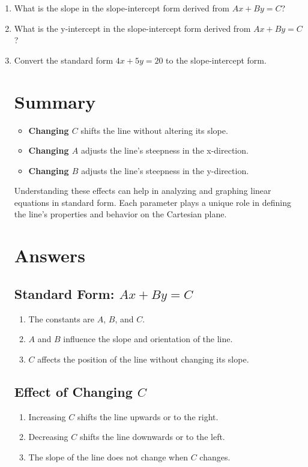 \documentclass[12pt]{article}
\begin{document}
\begin{enumerate}
    \item What is the slope in the slope-intercept form derived from \(Ax + By = C\)?
    \item What is the y-intercept in the slope-intercept form derived from \(Ax + By = C\)?
    \item Convert the standard form \(4x + 5y = 20\) to the slope-intercept form.

\section*{Summary}

\begin{itemize}
    \item \textbf{Changing \(C\)} shifts the line without altering its slope.
    \item \textbf{Changing \(A\)} adjusts the line's steepness in the x-direction.
    \item \textbf{Changing \(B\)} adjusts the line's steepness in the y-direction.
\end{itemize}

Understanding these effects can help in analyzing and graphing linear equations in standard form. Each parameter plays a unique role in defining the line's properties and behavior on the Cartesian plane.

\newpage

\section*{Answers}

\subsection*{Standard Form: \(Ax + By = C\)}
\begin{enumerate}
    \item The constants are \(A\), \(B\), and \(C\).
    \item \(A\) and \(B\) influence the slope and orientation of the line.
    \item \(C\) affects the position of the line without changing its slope.
\end{enumerate}

\subsection*{Effect of Changing \(C\)}
\begin{enumerate}
    \item Increasing \(C\) shifts the line upwards or to the right.
    \item Decreasing \(C\) shifts the line downwards or to the left.
    \item The slope of the line does not change when \(C\) changes.
\end{enumerate}


\end{enumerate}
\end{document}
